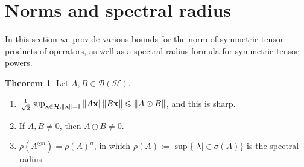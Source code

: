 \documentclass[10pt,reqno]{amsart}
\newcommand{\0}{{\color{lightgray}0}}
\newcommand{\B}{\mathcal{B}}
\renewcommand{\leq}{\leqslant}
\newcommand{\h}{\mathcal{H}}
\renewcommand{\vec}[1]{{\bf #1}}
\theoremstyle{definition}
\newtheorem{Theorem}[equation]{Theorem}
\numberwithin{equation}{section}
\begin{document}
\section{Norms and spectral radius}\label{Section:Norm}
In this section we provide various bounds for the norm of symmetric tensor products of operators, as well as a spectral-radius formula
for symmetric tensor powers.

\begin{Theorem}\label{Theorem:Norm}
Let $A,B \in \B(\h)$.
\begin{enumerate}
\item $\frac{1}{\sqrt{2}}\sup_{ \vec{x} \in \h, \|\vec{x}\| = 1}
 { \|A\vec{x}\| \|B\vec{x}\|}  \leq \| A \odot B \| $, and this is sharp.
\item If $A,B \neq 0$, then $A \odot B \neq 0$.
\item $\rho ( A^{\odot n} ) = \rho(A)^n$, in which $\rho(A) := \sup \{ |\lambda| \in \sigma(A) \}$ is the spectral radius
\end{enumerate}
\end{Theorem}
\end{document}

